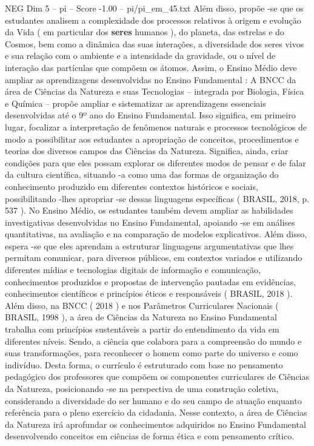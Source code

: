 \begin{textsample}{NEG Dim 5 – pi – Score -1.00 – pi/pi\_em\_45.txt}
Além disso, propõe -se que os estudantes analisem a complexidade dos processos relativos à origem e evolução da Vida ( em particular dos \textbf{seres} humanos ), do planeta, das estrelas e do Cosmos, bem como a dinâmica das suas interações, a diversidade dos seres vivos e sua relação com o ambiente e a intensidade da gravidade, ou o nível de interação das partículas que compõem os átomos.
Assim, o Ensino Médio deve ampliar as aprendizagens desenvolvidas no Ensino Fundamental : A BNCC da área de Ciências da Natureza e suas Tecnologias – integrada por Biologia, Física e Química – propõe ampliar e sistematizar as aprendizagens essenciais desenvolvidas até o 9º ano do Ensino Fundamental.
Isso significa, em primeiro lugar, focalizar a interpretação de fenômenos naturais e processos tecnológicos de modo a possibilitar aos estudantes a apropriação de conceitos, procedimentos e teorias dos diversos campos das Ciências da Natureza.
Significa, ainda, criar condições para que eles possam explorar os diferentes modos de pensar e de falar da cultura científica, situando -a como uma das formas de organização do conhecimento produzido em diferentes contextos históricos e sociais, possibilitando -lhes apropriar -se dessas linguagens específicas ( BRASIL, 2018, p. 537 ).
No Ensino Médio, os estudantes também devem ampliar as habilidades investigativas desenvolvidas no Ensino Fundamental, apoiando -se em análises quantitativas, na avaliação e na comparação de modelos explicativos.
Além disso, espera -se que eles aprendam a estruturar linguagens argumentativas que lhes permitam comunicar, para diversos públicos, em contextos variados e utilizando diferentes mídias e tecnologias digitais de informação e comunicação, conhecimentos produzidos e propostas de intervenção pautadas em evidências, conhecimentos científicos e princípios éticos e responsáveis ( BRASIL, 2018 ).
Além disso, na BNCC ( 2018 ) e nos Parâmetros Curriculares Nacionais ( BRASIL, 1998 ), a área de Ciências da Natureza no Ensino Fundamental trabalha com princípios sustentáveis a partir do entendimento da vida em diferentes níveis.
Sendo, a ciência que colabora para a compreensão do mundo e suas transformações, para reconhecer o homem como parte do universo e como indivíduo.
Desta forma, o currículo é estruturado com base no pensamento pedagógico dos professores que compõem os componentes curriculares de Ciências da Natureza, posicionando -se na perspectiva de uma construção coletiva, considerando a diversidade do ser humano e do seu campo de atuação enquanto referência para o pleno exercício da cidadania.
Nesse contexto, a área de Ciências da Natureza irá aprofundar os conhecimentos adquiridos no Ensino Fundamental desenvolvendo conceitos em ciências de forma ética e com pensamento crítico.

\end{textsample}
